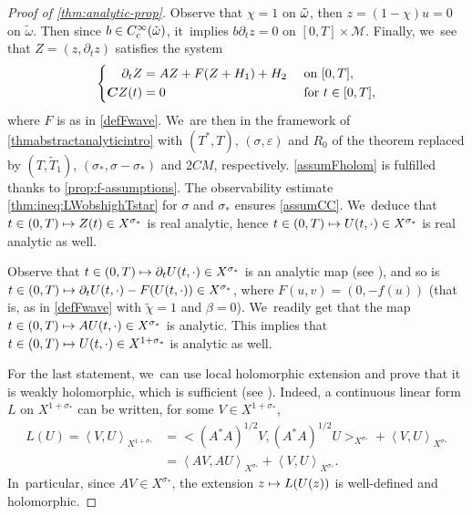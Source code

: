 \documentclass[10pt]{amsart}
\newcommand\mto{\mathchoice{\longmapsto}{\mapsto}{\mapsto}{\mapsto}}
\theoremstyle{definition}
\let\mc\mathcal
\let\veps\varepsilon
\newcommand{\M}{\mc{M}}
\newcommand{\bC}{\boldsymbol{C}}
\begin{document}
\begin{proof}[Proof of \cref{thm:analytic-prop}]
Observe that $\chi=1$ on $\Tilde{\omega}$, then $z=(1-\chi)u=0$ on $\widetilde{\omega}$. Then since $b\in C^{\infty}_c(\Tilde{\omega})$, it~implies $b\partial_t z=0$ on $[0,T]\times \M$.
Finally, we~see that $Z=(z, \partial_t z)$ satisfies the system
\begin{equation}\label{thm:proof:eq:}
\left\{\begin{aligned}
\partial_t Z&=AZ+F(Z+H_{1})+H_{2}&&\textnormal{ on } [0,T], \\
\bC Z(t)&=0 &&\textnormal{ for }t\in [0,T],
\end{aligned}\right.
\end{equation}
where $F$ is as in \eqref{defFwave}. We~are then in the framework of \cref{thmabstractanalyticintro} with $(T^*, T)$, $(\sigma, \veps)$ and $R_0$ of the theorem replaced by $(T, \widetilde{T}_1)$, $(\sigma_*, \sigma-\sigma_*)$ and $2CM$, respectively. \cref{assumFholom} is fulfilled thanks to \cref{prop:f-assumptions}. The observability estimate \eqref{thm:ineq:LWobshighTstar} for $\sigma$ and $\sigma_*$ ensures \cref{assumCC}. We~deduce that $t\in (0, T)\mto Z(t)\in X^{\sigma_*}$ is real analytic, hence $t\in (0, T)\mto U(t, \cdot)\in X^{\sigma_*}$ is real analytic as well.

Observe that $t\in (0, T)\mto \partial_t U(t, \cdot)\in X^{\sigma_*}$ is an analytic map (see \cite[Prop.\,6.4]{BS:71-analytic}), and so is $t\in (0, T)\mto \partial_t U(t, \cdot)-F(U(t,\cdot))\in X^{\sigma_*}$, where $F(u,v)=(0,-f(u))$ (that is, as in \eqref{defFwave} with $\widetilde{\chi}=1$ and $\beta=0$). We~readily get that the map $t\in (0, T)\mto A U(t, \cdot)\in X^{\sigma_*}$ is analytic. This implies that $t\in (0, T)\mto U(t, \cdot)\in X^{1+\sigma_*}$ is analytic as well.

For the last statement, we~can use local holomorphic extension and prove that it is weakly holomorphic, which is sufficient (see \cite[Th.\,8.12]{Muj86}). Indeed, a continuous linear form $L$ on $X^{1+\sigma_*}$ can be written, for some $V\in X^{1+\sigma_*}$,\vspace*{-3pt}
\begin{align*}
L(U)=\left<V,U\right>_{X^{1+\sigma_*}}&=\bigl<(A^*A)^{1/2}V,(A^*A)^{1/2}U\bigr>_{X^{\sigma_*}}+\left<V,U\right>_{X^{\sigma_*}}\\
&=\left<AV,AU\right>_{X^{\sigma_*}}+\left<V,U\right>_{X^{\sigma_*}}.
\end{align*}
In~particular, since $AV\in X^{\sigma_*}$, the extension $z\mto L(U(z))$ is well-defined and holomorphic.
\end{proof}
\end{document}
